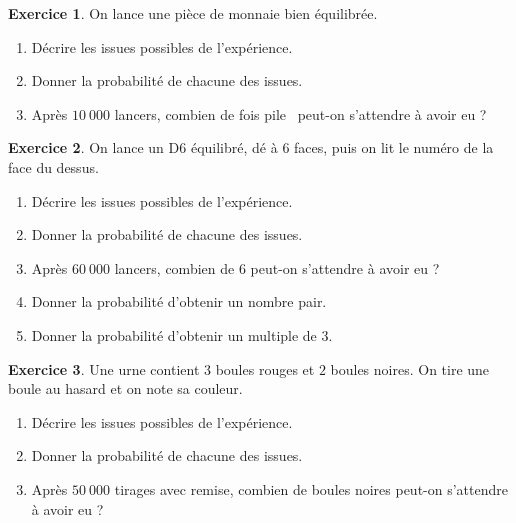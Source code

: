 \documentclass[12pt]{extarticle}
\theoremstyle{definition}
\newtheorem{ex}{Exercice}
\newcommand{\exe}[2]{
	\begin{ex} #1  \end{ex}
}
\begin{document}
\pagestyle{fancy}
\fancyhead[R]{\today}

\exe{
	On lance une pièce de monnaie bien équilibrée.
	\begin{enumerate}
		\item Décrire les issues possibles de l'expérience.
		\item Donner la probabilité de chacune des issues.
		\item Après $10~000$ lancers, combien de fois \og pile \fg ~peut-on s'attendre à avoir eu ?
	\end{enumerate}
}{}

\exe{
	On lance un D$6$ équilibré, dé à $6$ faces, puis on lit le numéro de la face du dessus.
	\begin{enumerate}
		\item Décrire les issues possibles de l'expérience.
		\item Donner la probabilité de chacune des issues.
		\item Après $60~000$ lancers, combien de $6$ peut-on s'attendre à avoir eu ?
		\item Donner la probabilité d'obtenir un nombre pair.
		\item Donner la probabilité d'obtenir un multiple de $3$.
	\end{enumerate}
}{}

\exe{
	Une urne contient $3$ boules rouges et $2$ boules noires. On tire une boule au hasard et on note sa couleur.
	\begin{enumerate}
		\item Décrire les issues possibles de l'expérience.
		\item Donner la probabilité de chacune des issues.
		\item Après $50~000$ tirages avec remise, combien de boules noires peut-on s'attendre à avoir eu ?
	\end{enumerate}
}{}
\end{document}
